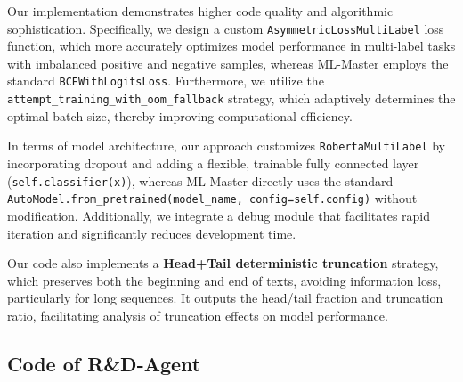 Our implementation demonstrates higher code quality and algorithmic sophistication. Specifically, we design a custom \texttt{AsymmetricLossMultiLabel} loss function, which more accurately optimizes model performance in multi-label tasks with imbalanced positive and negative samples, whereas ML-Master employs the standard \texttt{BCEWithLogitsLoss}. Furthermore, we utilize the \texttt{attempt\_training\_with\_oom\_fallback} strategy, which adaptively determines the optimal batch size, thereby improving computational efficiency. 

In terms of model architecture, our approach customizes \texttt{RobertaMultiLabel} by incorporating dropout and adding a flexible, trainable fully connected layer (\texttt{self.classifier(x)}), whereas ML-Master directly uses the standard \texttt{AutoModel.from\_pretrained(model\_name, config=self.config)} without modification. Additionally, we integrate a debug module that facilitates rapid iteration and significantly reduces development time.

Our code also implements a \textbf{Head+Tail deterministic truncation} strategy, which preserves both the beginning and end of texts, avoiding information loss, particularly for long sequences. It outputs the head/tail fraction and truncation ratio, facilitating analysis of truncation effects on model performance.







\subsection{Code of R\&D-Agent}


